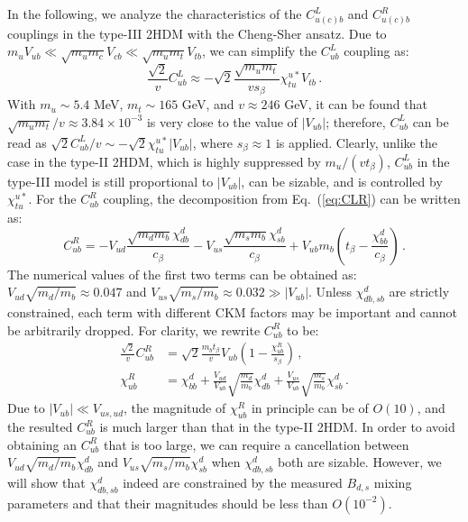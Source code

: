 \documentclass[prd,preprint,superscriptaddress,amsmath,amssymb]{revtex4}
\begin{document}
 In the following, we analyze the characteristics of the $C^{L}_{u(c) b}$ and $C^{R}_{u(c) b}$ couplings in the type-III 2HDM with the Cheng-Sher ansatz. Due to $m_u V_{ub} \ll \sqrt{m_u m_c} V_{cb} \ll \sqrt{m_u m_t} V_{tb}$,  we can simplify  the $C^{L}_{ub}$ coupling as: 
 \begin{equation}
 \frac{\sqrt{2}}{v} C^L_{ub} \approx  -\sqrt{2} \frac{ \sqrt{m_u m_t} }{ v s_\beta} \chi^{u*}_{tu} V_{tb}\,. \label{eq:CLub}
 \end{equation}
With $m_u\sim 5.4$ MeV, $m_t\sim 165$ GeV, and $v\approx 246$ GeV, it can be found that  $\sqrt{m_u m_t}/v\approx 3.84\times 10^{-3}$ is very close to the value of $|V_{ub}|$; therefore,  $C^L_{ub}$ can be read as $\sqrt{2} C^L_{ub}/v  \sim - \sqrt{2}\chi^{u*}_{tu}  |V_{ub}| $, where $s_\beta \approx 1$  is applied.   Clearly, unlike the case in the type-II 2HDM, which   is highly suppressed by $m_u/(v t_\beta)$, $C^L_{ub}$ in the type-III model  is still proportional to $|V_{ub}|$, can be sizable, and is controlled by   $\chi^{u*}_{tu}$.  For the $C^R_{ub}$ coupling,  the decomposition from Eq.~(\ref{eq:CLR}) can be written as:
  \begin{equation}
 C^R_{ub} =- V_{ud}  \frac{\sqrt{m_d m_b} \chi^d_{db} }{c_\beta} -  V_{us} \frac{\sqrt{m_s m_b} \chi^{d}_{sb}}{ c_\beta} + V_{ub} m_b \left(  t_\beta- \frac{ \chi^{d}_{bb}}{c_\beta} \right)  \,. 
 \end{equation}
The  numerical values of the first two terms can be obtained as: $V_{ud} \sqrt{m_d/ m_b}\approx 0.047$ and $V_{us} \sqrt{m_s /m_b} \approx 0.032 \gg |V_{ub}|$. Unless $\chi^d_{db,sb}$ are strictly constrained,  each term with  different CKM factors may  be important and cannot be arbitrarily dropped. For clarity, we rewrite   $C^R_{ub}$ to be:
 \begin{align}
 \frac{\sqrt{2}}{v}  C^R_{ub} &=  \sqrt{2}\frac{m_b t_\beta}{v}V_{ub}  \left( 1 - \frac{\chi^R_{ub}}{s_\beta}\right)\,,   
 \label{eq:CRub}\\
  \chi^R_{ub} &=  \chi^d_{bb} + \frac{V_{ud}}{V_{ub}} \sqrt{ \frac{m_d}{m_b}} \chi^d_{db}+  \frac{V_{us}}{V_{ub}} \sqrt{ \frac{m_s}{m_b}} \chi^d_{sb}\,. \label{eq:chiRub}
 \end{align} 
 Due to $|V_{ub}|\ll V_{us,ud}$,  the magnitude of $\chi^R_{ub}$ in principle can be of $O(10)$, and  the resulted $C^R_{ub}$ is much larger than that in the type-II 2HDM. In order to avoid obtaining an $C^R_{ub}$ that is too large, we can require a cancellation between $V_{ud} \sqrt{m_d/m_b} \chi^d_{db}$ and $V_{us} \sqrt{m_s/m_b} \chi^d_{sb}$ when $\chi^d_{db,sb}$ both are sizable. However, we will show that $\chi^d_{db,sb}$ indeed are constrained by the measured $B_{d,s}$ mixing parameters and that their magnitudes should be less than $O(10^{-2})$. 
 
\end{document}

